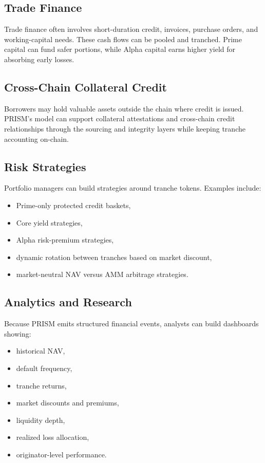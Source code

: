 \documentclass[11pt]{article}
\begin{document}
\subsection{Trade Finance}

Trade finance often involves short-duration credit, invoices, purchase orders,
and working-capital needs. These cash flows can be pooled and tranched. Prime
capital can fund safer portions, while Alpha capital earns higher yield for
absorbing early losses.

\subsection{Cross-Chain Collateral Credit}

Borrowers may hold valuable assets outside the chain where credit is issued.
PRISM's model can support collateral attestations and cross-chain credit
relationships through the sourcing and integrity layers while keeping tranche
accounting on-chain.

\subsection{Risk Strategies}

Portfolio managers can build strategies around tranche tokens. Examples include:

\begin{itemize}
  \item Prime-only protected credit baskets,
  \item Core yield strategies,
  \item Alpha risk-premium strategies,
  \item dynamic rotation between tranches based on market discount,
  \item market-neutral NAV versus AMM arbitrage strategies.
\end{itemize}

\subsection{Analytics and Research}

Because PRISM emits structured financial events, analysts can build dashboards
showing:

\begin{itemize}
  \item historical NAV,
  \item default frequency,
  \item tranche returns,
  \item market discounts and premiums,
  \item liquidity depth,
  \item realized loss allocation,
  \item originator-level performance.
\end{itemize}
\end{document}
